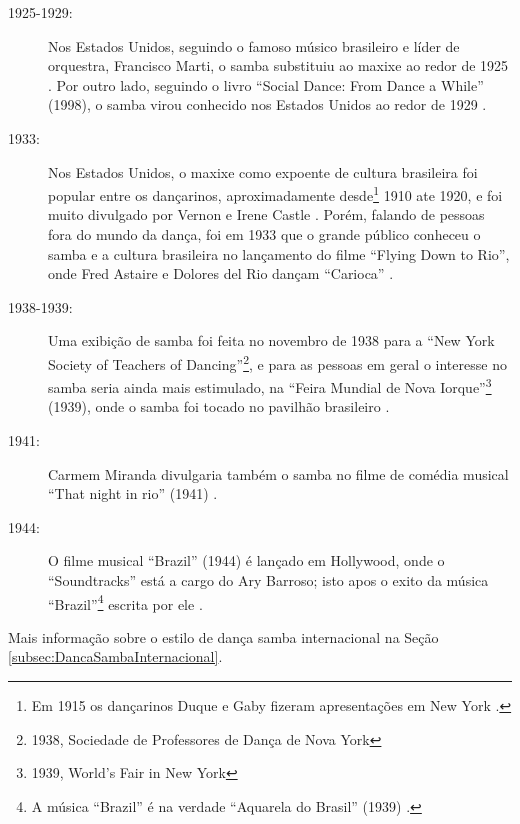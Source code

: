 \begin{description}
\item[1925-1929:] Nos Estados Unidos, seguindo o famoso músico brasileiro e líder de orquestra, 
Francisco Marti,
o samba substituiu ao maxixe ao redor de 1925 \cite[pp. 238]{hostetler1942walk}.
Por outro lado, seguindo o livro ``Social Dance: From Dance a While'' (1998),
o samba virou conhecido nos Estados Unidos ao redor de 1929
\cite[pp. 125]{harris1998social}.

\item[1933:] Nos Estados Unidos, o maxixe como expoente de cultura brasileira foi popular 
entre os dançarinos, aproximadamente desde\footnote{Em 
1915 os dançarinos Duque e Gaby fizeram apresentações em New York \cite[pp. 45]{maxixe1915duqueEEUU:1}.} 1910
ate 1920, e foi muito divulgado por Vernon e Irene Castle \cite[pp. 44]{stephenson1992complete}.
Porém, falando de pessoas fora do mundo da dança, 
foi em 1933 que o grande público conheceu o samba e a cultura brasileira no lançamento do filme
``Flying Down to Rio'',
onde Fred Astaire e Dolores del Rio dançam ``Carioca'' \cite[pp. 45]{maxixe1915duqueEEUU:1}.

\item[1938-1939:] Uma exibição de samba foi feita no novembro de 1938
para a ``New York Society of Teachers of Dancing''\footnote{1938, Sociedade de Professores de Dança de Nova York},
e para as pessoas em geral o interesse no samba seria ainda mais estimulado,
na ``Feira Mundial de Nova Iorque''\footnote{1939, World’s Fair in New York} (1939), 
onde o samba foi tocado no pavilhão brasileiro  \cite[pp. 45]{maxixe1915duqueEEUU:1}.

\item[1941:] Carmem Miranda divulgaria também o samba no
 filme de comédia musical ``That night in rio'' (1941) \cite[pp. 45]{maxixe1915duqueEEUU:1}.

\item[1944:] O filme musical ``Brazil'' (1944) é lançado em Hollywood,
onde o ``Soundtracks'' está a cargo do Ary Barroso;
isto apos o exito da música ``Brazil''\footnote{A 
música ``Brazil'' é na verdade ``Aquarela do Brasil'' (1939) 
\cite[pp. 73]{diniz2006almanaque} \cite[pp. 128]{perna2002samba} \cite[pp. 77]{fenerick2005nem}.} 
escrita por ele \cite[pp. 45]{maxixe1915duqueEEUU:1}.

\end{description}

Mais informação sobre o estilo de dança samba internacional na Seção \ref{subsec:DancaSambaInternacional}.

